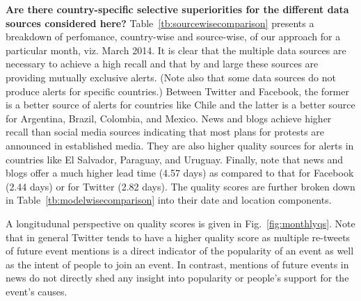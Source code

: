 \noindent
{\bf Are there country-specific selective superiorities for the different data sources considered here?}
Table~\ref{tb:sourcewisecomparison} presents a breakdown of perfomance, country-wise and source-wise, of 
our approach for a particular month, viz. March 2014.
It is clear that the multiple data sources are necessary to achieve a high recall and that by and large
these sources are providing mutually exclusive alerts. (Note also that some data sources do not produce alerts for specific
countries.) Between Twitter and Facebook, the former is a better
source of alerts for countries like Chile and the latter is a better source for Argentina, Brazil, Colombia, and Mexico.
News and blogs achieve higher recall than social media sources indicating that most plans for protests are announced
in established media. They are also
higher quality sources for alerts in countries like El Salvador, Paraguay, and Uruguay.
Finally, note that news and blogs offer a much higher lead time (4.57 days) 
as compared to that for Facebook (2.44 days) or for Twitter (2.82 days). The quality scores are
further broken down in Table~\ref{tb:modelwisecomparison} into their date and location components.

A longitudunal perspective on quality scores is
given in Fig.~\ref{fig:monthlyqs}. Note that in general Twitter tends to have a higher quality score
as multiple re-tweets of future event mentions is a direct indicator of the popularity of an event as 
well as the intent of people to join an event. 
In contrast, mentions of future events in news do not directly shed any insight into popularity or people's
support for the event's causes.\\

